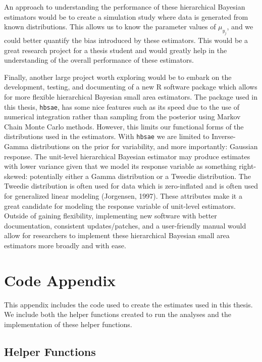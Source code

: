 \documentclass[12pt,twoside]{reedthesis}
\begin{document}
An approach to understanding the performance of these hierarchical Bayesian estimators would be to create a simulation study where data is generated from known distributions. This allows us to know the parameter values of \(\mu_{y_j}\), and we could better quantify the bias introduced by these estimators. This would be a great research project for a thesis student and would greatly help in the understanding of the overall performance of these estimators.

Finally, another large project worth exploring would be to embark on the development, testing, and documenting of a new R software package which allows for more flexible hierarchical Bayesian small area estimators. The package used in this thesis, \texttt{hbsae}, has some nice features such as its speed due to the use of numerical integration rather than sampling from the posterior using Markov Chain Monte Carlo methods. However, this limits our functional forms of the distributions used in the estimators. With \texttt{hbsae} we are limited to Inverse-Gamma distributions on the prior for variability, and more importantly: Gaussian response. The unit-level hierarchical Bayesian estimator may produce estimates with lower variance given that we model its response variable as something right-skewed: potentially either a Gamma distribution or a Tweedie distribution. The Tweedie distribution is often used for data which is zero-inflated and is often used for generalized linear modeling (Jorgensen, 1997). These attributes make it a great candidate for modeling the response variable of unit-level estimators. Outside of gaining flexibility, implementing new software with better documentation, consistent updates/patches, and a user-friendly manual would allow for researchers to implement these hierarchical Bayesian small area estimators more broadly and with ease.

\appendix

\hypertarget{code-appendix}{%
\chapter{Code Appendix}\label{code-appendix}}

This appendix includes the code used to create the estimates used in this thesis. We include both the helper functions created to run the analyses and the implementation of these helper functions.

\hypertarget{helper-functions}{%
\section{Helper Functions}\label{helper-functions}}
\end{document}
